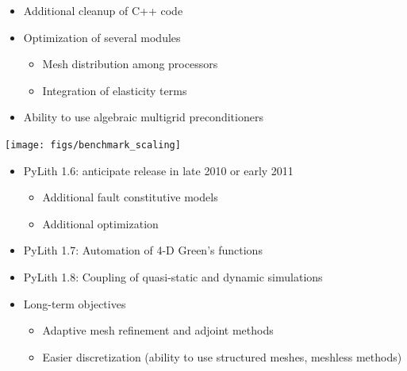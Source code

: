 \documentclass[pdftex,cig,slideColor]{pp4slides}
\begin{document}
  \summary{}

  \begin{itemize}
  \item Additional cleanup of C++ code
  \item Optimization of several modules
    \begin{itemize}
    \item Mesh distribution among processors
    \item Integration of elasticity terms
    \end{itemize}
  \item Ability to use algebraic multigrid preconditioners
 \end{itemize}
    


  \vfill
  \begin{center}
    \texttt{[image: figs/benchmark\_scaling]}
  \end{center}
  \vfill


  \begin{itemize}
  \item PyLith 1.6: anticipate release in late 2010 or early 2011
    \begin{itemize}
    \item Additional fault constitutive models
    \item Additional optimization
    \end{itemize}
  \item PyLith 1.7: Automation of 4-D Green's functions
  \item PyLith 1.8: Coupling of quasi-static and dynamic simulations
  \item Long-term objectives
    \begin{itemize}
    \item Adaptive mesh refinement and adjoint methods
    \item Easier discretization (ability to use structured meshes,
      meshless methods)
    \end{itemize}
 \end{itemize}
\end{document}
